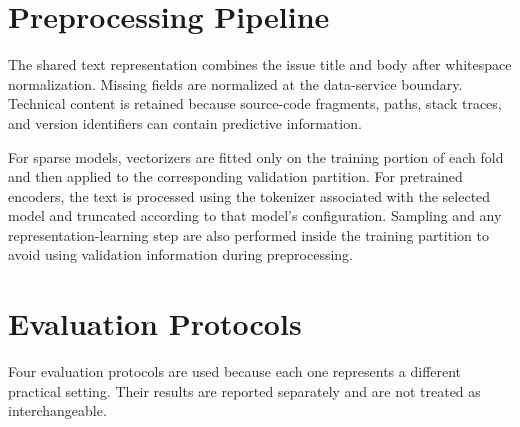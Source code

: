 \section{Preprocessing Pipeline}
The shared text representation combines the issue title and body after whitespace normalization. Missing fields are normalized at the data-service boundary. Technical content is retained because source-code fragments, paths, stack traces, and version identifiers can contain predictive information.

For sparse models, vectorizers are fitted only on the training portion of each fold and then applied to the corresponding validation partition. For pretrained encoders, the text is processed using the tokenizer associated with the selected model and truncated according to that model's configuration. Sampling and any representation-learning step are also performed inside the training partition to avoid using validation information during preprocessing.

\section{Evaluation Protocols}
Four evaluation protocols are used because each one represents a different practical setting. Their results are reported separately and are not treated as interchangeable.

